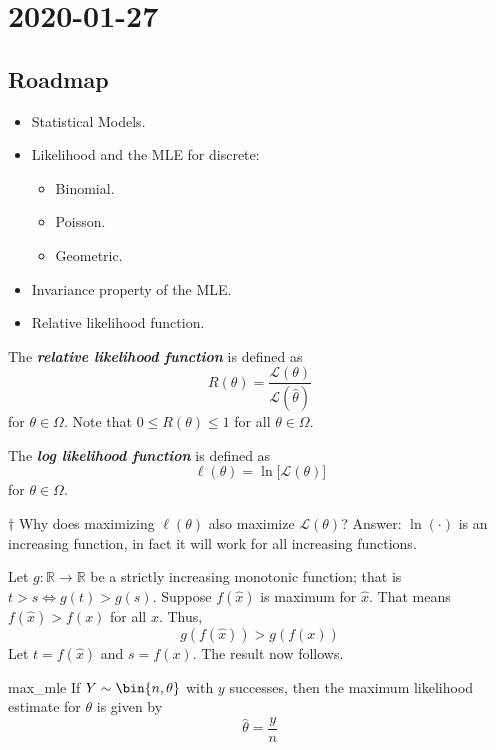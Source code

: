 \section{2020-01-27}
\subsection*{Roadmap}
\begin{itemize}
    \item Statistical Models.
    \item Likelihood and the MLE for discrete:
          \begin{itemize}
              \item Binomial.
              \item Poisson.
              \item Geometric.
          \end{itemize}
    \item Invariance property of the MLE.
    \item Relative likelihood function.
\end{itemize}

\begin{Definition}{}{}
    The \textbf{\emph{relative likelihood function}} is defined as
    \[ R(\theta)=\frac{\mathcal{L}(\theta)}{\mathcal{L}(\hat{\theta})} \]
    for $ \theta\in\Omega $. Note that $ 0\leqslant R(\theta)\leqslant 1 $
    for all $ \theta\in\Omega $.
\end{Definition}


\begin{Definition}{}{}
    The \textbf{\emph{log likelihood function}} is defined as
    \[ \ell(\theta)=\ln\bigl[\mathcal{L}(\theta) \bigr] \]
    for $ \theta\in\Omega $.
\end{Definition}

$ \dagger $ Why does maximizing $ \ell(\theta) $ also maximize $ \mathcal{L}(\theta) $?
Answer: $ \ln(\cdot) $ is an increasing function, in fact it will work for all increasing functions.

Let $ g:\mathbb{R}\to\mathbb{R} $ be a strictly increasing monotonic function;
that is $ t>s \iff g(t)>g(s) $. Suppose $ f(\hat{x}) $ is maximum for $ \hat{x} $.
That means $ f(\hat{x})>f(x) $ for all $ x $. Thus,
\[ g(f(\hat{x}))>g(f(x)) \]
Let $ t=f(\hat{x}) $ and $ s=f(x) $. The result now follows.


\begin{Proposition}{}{max_mle}
    If $ Y \sim \bin{n,\theta} $ with $ y $ successes, then the
    maximum likelihood estimate for $ \theta $ is given by
    \[ \hat{\theta}=\frac{y}{n} \]
\end{Proposition}


